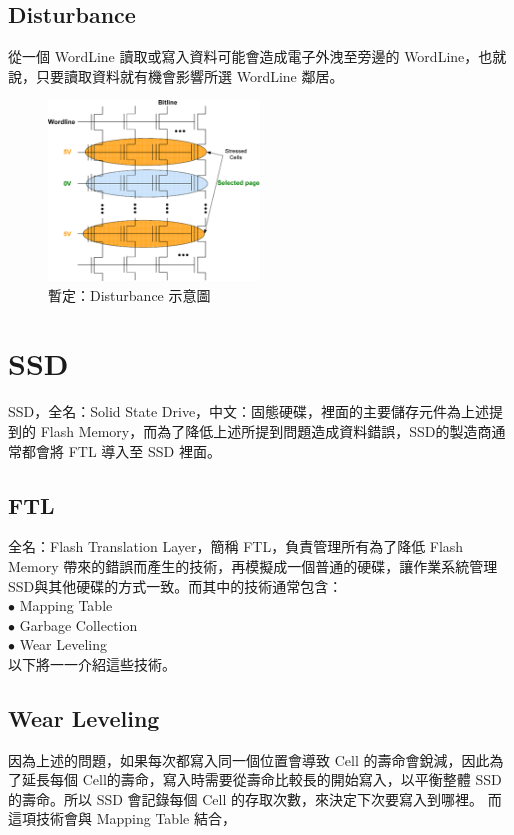 \subsection{Disturbance}\label{s2.1.3}
\indent
從一個 WordLine 讀取或寫入資料可能會造成電子外洩至旁邊的 WordLine，也就說，只要讀取資料就有機會影響所選 WordLine 鄰居。
\begin{figure}[H]
    \centering
    \includegraphics[width=0.5\textwidth]{picture/ch2/disturbance.png}
    \caption{暫定：Disturbance 示意圖}
    \label{f2.3}
\end{figure}

\section{SSD}\label{s2.2}
\indent
SSD，全名：Solid State Drive，中文：固態硬碟，裡面的主要儲存元件為上述提到的 Flash Memory，而為了降低上述所提到問題造成資料錯誤，SSD的製造商通常都會將 FTL 導入至 SSD 裡面。

\subsection{FTL}\label{s2.2.1}
\indent
全名：Flash Translation Layer，簡稱 FTL，負責管理所有為了降低 Flash Memory 帶來的錯誤而產生的技術，再模擬成一個普通的硬碟，讓作業系統管理SSD與其他硬碟的方式一致。而其中的技術通常包含：\\
$\bullet$ Mapping Table \\
$\bullet$ Garbage Collection \\
$\bullet$ Wear Leveling \\
以下將一一介紹這些技術。

\subsection{Wear Leveling}\label{s2.2.2}
\indent
因為上述的問題，如果每次都寫入同一個位置會導致 Cell 的壽命會銳減，因此為了延長每個 Cell的壽命，寫入時需要從壽命比較長的開始寫入，以平衡整體 SSD 的壽命。所以 SSD 會記錄每個 Cell 的存取次數，來決定下次要寫入到哪裡。
而這項技術會與 Mapping Table 結合，

